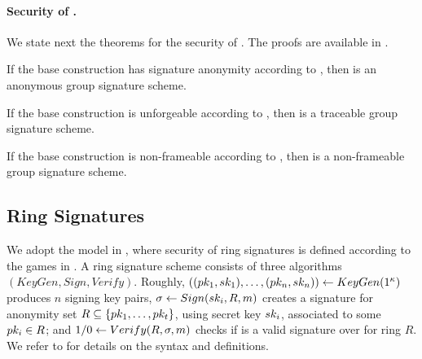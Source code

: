 \paragraph{Security of \CUASGS.} %
We state next the theorems for the security of \CUASGS. The proofs are available
in .

\begin{theorem}
  If the base \CUASGen construction has signature anonymity according to
  , then \CUASGS is an anonymous group signature
  scheme.
\end{theorem}

\begin{theorem}
  If the base \CUASGen construction is unforgeable according to
  , then \CUASGS is a traceable group signature scheme.
\end{theorem}

\begin{theorem}
  If the base \CUASGen construction is non-frameable according to
  , then \CUASGS is a non-frameable group signature
  scheme.
\end{theorem}

\subsection{Ring Signatures}
\label{ssec:related-models-rs}

We adopt the model in \cite{bkm06}, where security of ring signatures is
defined according to the games in . A ring signature
scheme consists of three algorithms $(KeyGen,Sign,Verify)$. Roughly,
$((pk_1,sk_1),\dots,(pk_n,sk_n)) \gets KeyGen(1^\kappa)$ produces $n$
signing key pairs, $\sigma \gets Sign(sk_i,R,m)$ creates a signature for
anonymity set $R \subseteq \lbrace pk_1, \dots, pk_t \rbrace$, using secret
key $sk_i$, associated to some $pk_i \in R$; and $1/0 \gets Verify(R,\sigma,
m)$ checks if \sig is a valid signature over \msg for ring $R$. We refer
to \cite{bkm06} for details on the syntax and definitions.

